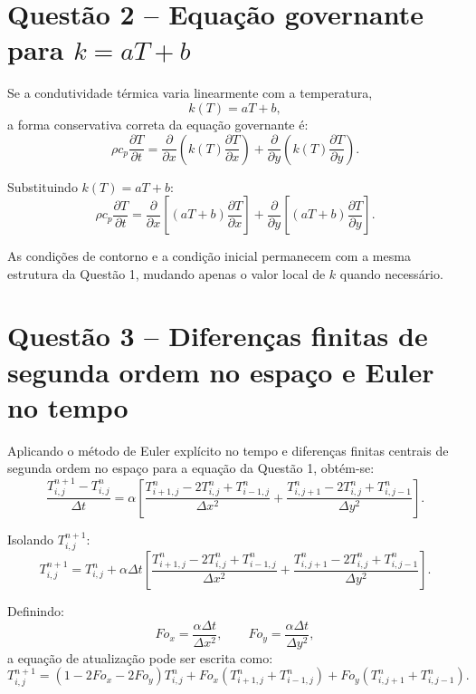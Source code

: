\documentclass[12pt,a4paper]{article}
\begin{document}
\section{Questão 2 -- Equação governante para $k=aT+b$}
Se a condutividade térmica varia linearmente com a temperatura,
\begin{equation}
k(T)=aT+b,
\end{equation}
a forma conservativa correta da equação governante é:
\begin{equation}
\rho c_p \frac{\partial T}{\partial t} = \frac{\partial}{\partial x}\left(k(T)\frac{\partial T}{\partial x}\right) + \frac{\partial}{\partial y}\left(k(T)\frac{\partial T}{\partial y}\right).
\end{equation}

Substituindo $k(T)=aT+b$:
\begin{equation}
\rho c_p \frac{\partial T}{\partial t} = \frac{\partial}{\partial x}\left[(aT+b)\frac{\partial T}{\partial x}\right] + \frac{\partial}{\partial y}\left[(aT+b)\frac{\partial T}{\partial y}\right].
\end{equation}

As condições de contorno e a condição inicial permanecem com a mesma estrutura da Questão 1, mudando apenas o valor local de $k$ quando necessário.

\section{Questão 3 -- Diferenças finitas de segunda ordem no espaço e Euler no tempo}
Aplicando o método de Euler explícito no tempo e diferenças finitas centrais de segunda ordem no espaço para a equação da Questão 1, obtém-se:
\begin{equation}
\frac{T_{i,j}^{n+1}-T_{i,j}^{n}}{\Delta t} = \alpha \left[
\frac{T_{i+1,j}^{n}-2T_{i,j}^{n}+T_{i-1,j}^{n}}{\Delta x^2}
+
\frac{T_{i,j+1}^{n}-2T_{i,j}^{n}+T_{i,j-1}^{n}}{\Delta y^2}
\right].
\end{equation}

Isolando $T_{i,j}^{n+1}$:
\begin{equation}
T_{i,j}^{n+1}=T_{i,j}^{n}
+ \alpha\Delta t \left[
\frac{T_{i+1,j}^{n}-2T_{i,j}^{n}+T_{i-1,j}^{n}}{\Delta x^2}
+
\frac{T_{i,j+1}^{n}-2T_{i,j}^{n}+T_{i,j-1}^{n}}{\Delta y^2}
\right].
\end{equation}

Definindo:
\begin{equation}
Fo_x = \frac{\alpha\Delta t}{\Delta x^2},
\qquad
Fo_y = \frac{\alpha\Delta t}{\Delta y^2},
\end{equation}
a equação de atualização pode ser escrita como:
\begin{equation}
T_{i,j}^{n+1}=(1-2Fo_x-2Fo_y)T_{i,j}^{n} + Fo_x(T_{i+1,j}^{n}+T_{i-1,j}^{n}) + Fo_y(T_{i,j+1}^{n}+T_{i,j-1}^{n}).
\end{equation}
\end{document}
